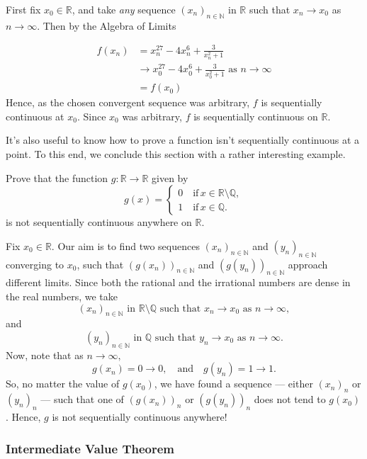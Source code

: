 \documentclass[
  12pt,
  a4paper]{extarticle}
\theoremstyle{plain}
\theoremstyle{plain}
\theoremstyle{plain}
\theoremstyle{plain}
\theoremstyle{plain}
\theoremstyle{definition}
\theoremstyle{definition}
\theoremstyle{definition}
\theoremstyle{remark}
\let\BeginKnitrBlock\begin \let\EndKnitrBlock\end
\renewcommand{\;}{\,}
\begin{document}
\BeginKnitrBlock{solution*}
First fix \(x_0 \in \mathbb{R}\), and take \emph{any} sequence \((x_n)_{n\in\mathbb{N}}\) in \(\mathbb{R}\) such that \(x_n \to x_0\) as \(n \to \infty\). Then by the Algebra of Limits

\begin{align*}
f(x_n) &= x_n^{27} - 4x_n^{6} + \frac{3}{x_n^2 +1}\\
&\to x_0^{27} - 4x_0^6 + \frac{3}{x_0^2 + 1}\; \; \text{as $n \to \infty$}\\
& = f(x_0) 
\end{align*}
Hence, as the chosen convergent sequence was arbitrary, \(f\) is sequentially continuous at \(x_0\). Since \(x_0\) was arbitrary, \(f\) is sequentially continuous on \(\mathbb{R}\).
\EndKnitrBlock{solution*}

It's also useful to know how to prove a function isn't sequentially continuous at a point. To this end, we conclude this section with a rather interesting example.
\BeginKnitrBlock{example}
{\label{exm:ex2} }Prove that the function \(g: \mathbb{R} \to \mathbb{R}\) given by \[g(x) = \begin{cases}
0 \quad \text{if} \; x \in \mathbb{R}\setminus\mathbb{Q},\\
1 \quad \text{if} \; x \in \mathbb{Q}.
\end{cases}\] is not sequentially continuous anywhere on \(\mathbb{R}\).
\EndKnitrBlock{example}

\BeginKnitrBlock{solution*}
Fix \(x_0 \in \mathbb{R}\). Our aim is to find two sequences \((x_n)_{n\in\mathbb{N}}\) and \((y_n)_{n\in\mathbb{N}}\) converging to \(x_0\), such that \(\left(g(x_n)\right)_{n\in\mathbb{N}}\) and \(\left(g(y_n)\right)_{n\in\mathbb{N}}\) approach different limits. Since both the rational and the irrational numbers are dense in the real numbers, we take \[(x_n)_{n\in\mathbb{N}}\;\; \text{in}\;\; \mathbb{R}\setminus\mathbb{Q} \;\; \text{such that} \;\; x_n \to x_0 \;\; \text{as}\;\; n \to \infty,\] and \[(y_n)_{n\in\mathbb{N}}\;\; \text{in}\;\; \mathbb{Q} \;\; \text{such that} \;\; y_n \to x_0 \;\; \text{as}\;\; n \to \infty.\] Now, note that as \(n \to \infty,\) \[g(x_n) = 0 \to 0, \quad \text{and} \quad g(y_n) = 1 \to 1.\] So, no matter the value of \(g(x_0)\), we have found a sequence --- either \((x_n)_n\) or \((y_n)_n\) --- such that one of \(\left(g(x_n)\right)_n\) or \(\left(g(y_n)\right)_n\) does not tend to \(g(x_0)\). Hence, \(g\) is not sequentially continuous anywhere!
\EndKnitrBlock{solution*}

\hypertarget{intermediate-value-theorem}{%
\subsubsection{Intermediate Value Theorem}\label{intermediate-value-theorem}}
\end{document}
